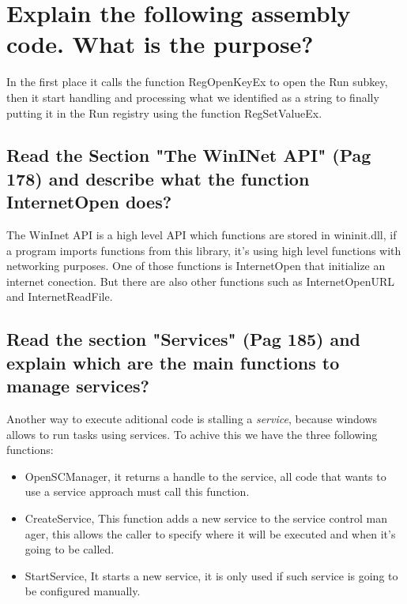 \documentclass[10pt,a4paper]{article} %
\begin{document}
        \section{Explain the following assembly code. What is the purpose?}

        In the first place it calls the function RegOpenKeyEx to open the Run
        subkey, then it start handling and processing what we identified as a
        string to finally putting it in the Run registry using the function
        RegSetValueEx.

        \subsection{ Read the Section "The WinINet API" (Pag 178) and describe what
        the function InternetOpen does?}

        The WinInet API is a high level API which functions are stored in
        wininit.dll, if a  program imports functions from this library, it's using
        high level functions with networking purposes. One of those functions is
        InternetOpen that initialize an internet conection. But there are also
        other functions such as InternetOpenURL and InternetReadFile.

        \subsection{Read the section "Services" (Pag 185) and explain which are the
        main functions to manage services?}

        Another way to execute aditional code is stalling a \textit{service},
        because windows allows to run tasks using services. To achive this we have
        the three following functions:

        \begin{itemize}
            \item OpenSCManager, it returns a handle to the service, all code that
                wants to use a service approach must call this function.
            \item CreateService, This function adds a new service to the service
                control man ager, this allows the caller to specify where it will
                be executed and when it's going to be called.
            \item StartService, It starts a new service, it is only used if such
                service is going to be configured manually.
        \end{itemize}
\end{document}
